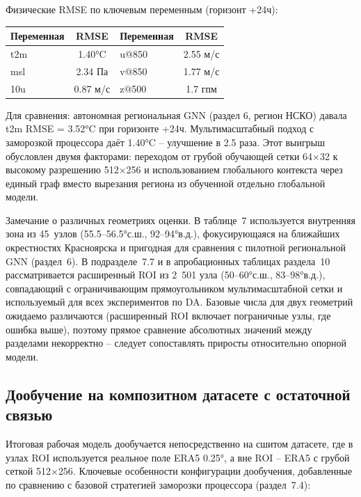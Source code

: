 \documentclass[14pt,a4paper]{extarticle}
\newcounter{none}
\numberwithin{table}{section}
\numberwithin{figure}{section}
\numberwithin{equation}{section}
\begin{document}
Физические RMSE по ключевым переменным (горизонт +24ч):

{\def\LTcaptype{none} %
\begin{longtable}[]{@{}lclc@{}}
\toprule\noalign{}
Переменная & RMSE & Переменная & RMSE \\
\midrule\noalign{}
\endhead
\bottomrule\noalign{}
\endlastfoot
t2m & 1.40°C & u@850 & 2.55 м/с \\
msl & 2.34 Па & v@850 & 1.77 м/с \\
10u & 0.87 м/с & z@500 & 1.7 гпм \\
\end{longtable}
}

Для сравнения: автономная региональная GNN (раздел 6, регион НСКО)
давала t2m RMSE = 3.52°C при горизонте +24ч. Мультимасштабный подход
с заморозкой процессора даёт 1.40°C -- улучшение в 2.5 раза. Этот выигрыш
обусловлен двумя факторами: переходом от грубой обучающей сетки
64$\times$32 к высокому разрешению 512$\times$256 и использованием
глобального контекста через единый граф вместо вырезания региона из
обученной отдельно глобальной модели.

Замечание о различных геометриях оценки. В таблице~7
используется внутренняя зона из 45~узлов (55.5--56.5°с.ш.,
92--94°в.д.), фокусирующаяся на ближайших окрестностях
Красноярска и пригодная для сравнения с пилотной региональной GNN
(раздел~6). В подразделе~7.7 и в апробационных
таблицах раздела~10 рассматривается расширенный ROI из
2~501 узла (50--60°с.ш., 83--98°в.д.), совпадающий с ограничивающим
прямоугольником мультимасштабной сетки и используемый для всех
экспериментов по DA. Базовые числа для двух геометрий ожидаемо
различаются (расширенный ROI включает пограничные узлы, где
ошибка выше), поэтому прямое сравнение абсолютных значений между
разделами некорректно -- следует сопоставлять приросты
относительно опорной модели.

\subsection{Дообучение на композитном датасете с остаточной связью}

Итоговая рабочая модель дообучается непосредственно на сшитом
датасете, где в узлах ROI используется реальное
поле ERA5 0.25°, а вне ROI -- ERA5 с грубой сеткой 512$\times$256.
Ключевые особенности конфигурации дообучения, добавленные по
сравнению с базовой стратегией заморозки процессора (раздел~7.4):
\end{document}
